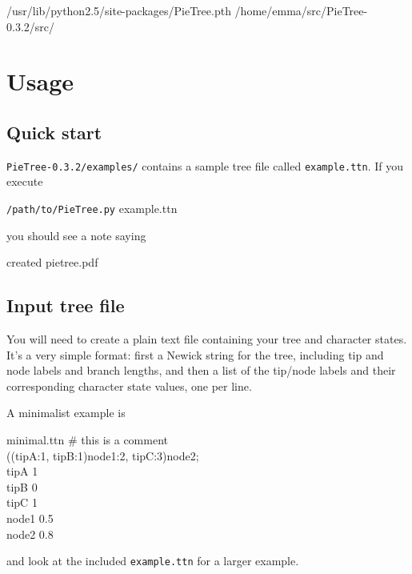 \documentclass[10pt]{article}
\newcommand{\PTpath}{\texttt{/path/to/PieTree.py}\xspace}
\begin{document}
\begin{filesays}{/usr/lib/python2.5/site-packages/PieTree.pth}
	/home/emma/src/PieTree-0.3.2/src/
\end{filesays}



\section*{Usage}

\subsection*{Quick start}

\texttt{PieTree-0.3.2/examples/} contains a sample tree file called \texttt{example.ttn}.
If you execute
\begin{commandis}
	\PTpath example.ttn
\end{commandis}
you should see a note saying
\begin{commandis}
	created pietree.pdf
\end{commandis}


\subsection*{Input tree file}

You will need to create a plain text file containing your tree and character states.
It's a very simple format: first a Newick string for the tree, including tip and node labels and branch lengths, and then a list of the tip/node labels and their corresponding character state values, one per line.

A minimalist example is

\begin{filesays}{minimal.ttn}
	\# this is a comment   \\
	((tipA:1, tipB:1)node1:2, tipC:3)node2; \\
	tipA   1		\\
	tipB   0		\\
	tipC   1		\\
	node1  0.5	\\
	node2  0.8
\end{filesays}
and look at the included \texttt{example.ttn} for a larger example.
\end{document}
